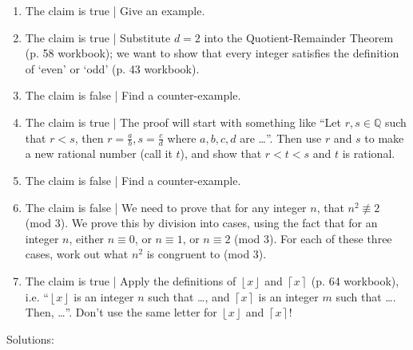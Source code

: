 \documentclass[a4paper,12pt]{article}
\newcommand{\floor}[1]{\left\lfloor #1 \right\rfloor}
\newcommand{\ceil}[1]{\left\lceil #1 \right\rceil}
\begin{document}
\begin{enumerate}
\item The claim is true | Give an example.
\\
\item The claim is true | Substitute $d = 2$ into the Quotient-Remainder
Theorem (p. 58 workbook); we want to show that every integer satisfies the definition of
`even' or `odd' (p. 43 workbook).
\\
\item The claim is false | Find a counter-example.
\\
\item The claim is true | The proof will start with something like
``Let $r, s \in \mathbb{Q}$ such that $r < s$, then $r = \frac{a}{b},
s = \frac{c}{d}$ where $a, b, c, d$ are \dots''.
Then use $r$ and $s$ to make a new rational number (call it $t$), and show that
$r < t < s$ and $t$ is rational.
\\
\item The claim is false | Find a counter-example.
\\
\item The claim is false | We need to prove that for any integer $n$, that
$n^2 \not\equiv 2$ (mod 3). We prove this by division into cases, using the
fact that for an integer $n$, either $n \equiv 0$,
or $n \equiv 1$, or $n \equiv 2$ (mod 3). For each of these three cases,
work out what $n^2$ is congruent to (mod 3).
\\
\item The claim is true | Apply the definitions of $\floor{x}$ and $\ceil{x}$
(p. 64 workbook), i.e. ``$\floor{x}$ is an integer $n$ such that
\dots, and $\ceil{x}$ is an integer $m$ such that \dots. Then, \dots''.
Don't use the same letter for $\floor{x}$ and $\ceil{x}$!
\end{enumerate}

\newpage

Solutions:
\end{document}
